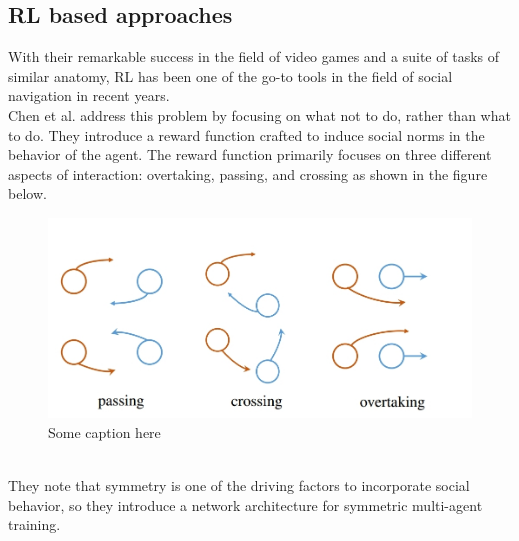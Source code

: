 \subsection*{RL based approaches}
 With their remarkable success in the field of video games and a suite of tasks of similar anatomy, RL has been one of the go-to tools in the field of social navigation in recent years. \\
Chen et al. \cite{chen_socially_2017} address this problem by focusing on what not to do, rather than what to do. They introduce a reward function crafted to induce social norms in the behavior of the agent. The reward function primarily focuses on three different aspects of interaction: overtaking, passing, and crossing as shown in the figure below.
 \begin{figure}[!htbp]
     \centering
    \includegraphics[width=.6\linewidth]{figures/chapter2_rl_based_approach}
    \caption{Some caption here}
    \label{fig:label1}
 \end{figure}
\\
They note that symmetry is one of the driving factors to incorporate social behavior, so they introduce a network architecture for symmetric multi-agent training.\\

